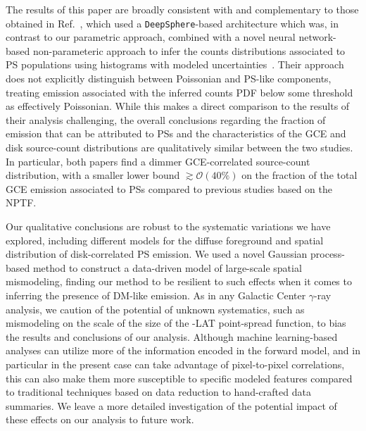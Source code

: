 \documentclass[prd,aps,10pt,nofootinbib,twocolumn,superscriptaddress,preprintnumbers,balancelastpage,longbibliography,floatfix]{revtex4-2}
\begin{document}
The results of this paper are broadly consistent with and complementary to those obtained in Ref.~\cite{List:2021aer}, which used a \texttt{DeepSphere}-based architecture which was, in contrast to our parametric approach, combined with a novel neural network-based non-parameteric approach to infer the counts distributions associated to PS populations using histograms with modeled uncertainties~\cite{List2021}. Their approach does not explicitly distinguish between Poissonian and PS-like components, treating emission associated with the inferred counts PDF below some threshold as effectively Poissonian. While this makes a direct comparison to the results of their analysis challenging, the overall conclusions regarding the fraction of emission that can be attributed to PSs and the characteristics of the GCE and disk source-count distributions are qualitatively similar between the two studies. In particular, both papers find a dimmer GCE-correlated source-count distribution, with a smaller lower bound $\gtrsim \mathcal O(40\%)$ on the fraction of the total GCE emission associated to PSs compared to previous studies based on the NPTF.

Our qualitative conclusions are robust to the systematic variations we have explored, including different models for the diffuse foreground and spatial distribution of disk-correlated PS emission. We used a novel Gaussian process-based method to construct a data-driven model of large-scale spatial mismodeling, finding our method to be resilient to such effects when it comes to inferring the presence of DM-like emission. As in any Galactic Center $\gamma$-ray analysis, we caution of the potential of unknown systematics, such as mismodeling on the scale of the size of the \Fermi-LAT point-spread function, to bias the results and conclusions of our analysis. Although machine learning-based analyses can utilize more of the information encoded in the forward model, and in particular in the present case can take advantage of pixel-to-pixel correlations, this can also make them more susceptible to specific modeled features compared to traditional techniques based on data reduction to hand-crafted data summaries. We leave a more detailed investigation of the potential impact of these effects on our analysis to future work.
\end{document}
